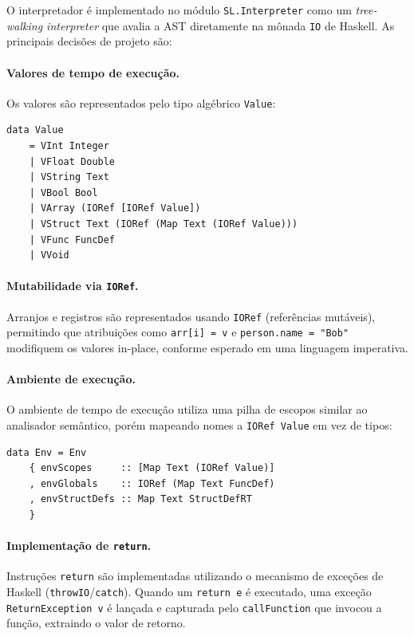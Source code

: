 \documentclass[12pt,a4paper]{article}
\begin{document}
O interpretador é implementado no módulo \texttt{SL.Interpreter} como um \textit{tree-walking interpreter} que avalia a AST diretamente na mônada \texttt{IO} de Haskell. As principais decisões de projeto são:

\paragraph{Valores de tempo de execução.} Os valores são representados pelo tipo algébrico \texttt{Value}:

\begin{lstlisting}[style=haskell]
data Value
    = VInt Integer
    | VFloat Double
    | VString Text
    | VBool Bool
    | VArray (IORef [IORef Value])
    | VStruct Text (IORef (Map Text (IORef Value)))
    | VFunc FuncDef
    | VVoid
\end{lstlisting}

\paragraph{Mutabilidade via \texttt{IORef}.} Arranjos e registros são representados usando \texttt{IORef} (referências mutáveis), permitindo que atribuições como \texttt{arr[i] = v} e \texttt{person.name = "Bob"} modifiquem os valores in-place, conforme esperado em uma linguagem imperativa.

\paragraph{Ambiente de execução.} O ambiente de tempo de execução utiliza uma pilha de escopos similar ao analisador semântico, porém mapeando nomes a \texttt{IORef Value} em vez de tipos:

\begin{lstlisting}[style=haskell]
data Env = Env
    { envScopes     :: [Map Text (IORef Value)]
    , envGlobals    :: IORef (Map Text FuncDef)
    , envStructDefs :: Map Text StructDefRT
    }
\end{lstlisting}

\paragraph{Implementação de \texttt{return}.} Instruções \texttt{return} são implementadas utilizando o mecanismo de exceções de Haskell (\texttt{throwIO}/\texttt{catch}). Quando um \texttt{return e} é executado, uma exceção \texttt{ReturnException v} é lançada e capturada pelo \texttt{callFunction} que invocou a função, extraindo o valor de retorno.
\end{document}
